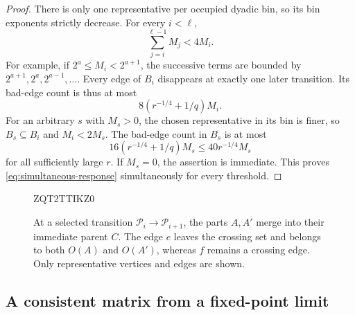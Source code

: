 \documentclass[11pt]{amsart}
\theoremstyle{definition}
\theoremstyle{remark}
\numberwithin{equation}{section}
\begin{document}
\begin{proof}
There is only one representative per occupied dyadic bin, so its
bin exponents strictly decrease. For every \(i<\ell\),
\begin{equation}\label{eq:dyadic-tail}
 \sum_{j=i}^{\ell-1}M_j<4M_i.
\end{equation}
For example, if \(2^a\le M_i<2^{a+1}\), the successive terms are
bounded by \(2^{a+1},2^a,2^{a-1},\ldots\).
Every edge of \(B_i\) disappears at exactly one later transition.
Its bad-edge count is thus at most
\[
 8(r^{-1/4}+1/q)M_i.
\]
For an arbitrary \(s\) with \(M_s>0\), the chosen representative
in its bin is finer, so \(B_s\subseteq B_i\) and \(M_i<2M_s\).
The bad-edge count in \(B_s\) is at most
\[
 16(r^{-1/4}+1/q)M_s\le40r^{-1/4}M_s
\]
for all sufficiently large \(r\). If \(M_s=0\), the assertion is
immediate. This proves \eqref{eq:simultaneous-response}
simultaneously for every threshold.
\end{proof}

\begin{figure}[tbp]
  
  \begingroup
  ZQT2TTIKZ0
  \endgroup
  \caption{At a selected transition $\mathcal P_i\to\mathcal P_{i+1}$,
    the parts $A,A'$ merge into their immediate parent $C$.
    The edge $e$ leaves the crossing set and belongs to both $O(A)$ and
    $O(A')$, whereas $f$ remains a crossing edge.
    Only representative vertices and edges are shown.}
  \label{fig:hierarchy}
\end{figure}


\subsection{A consistent matrix from a fixed-point limit}
\end{document}
